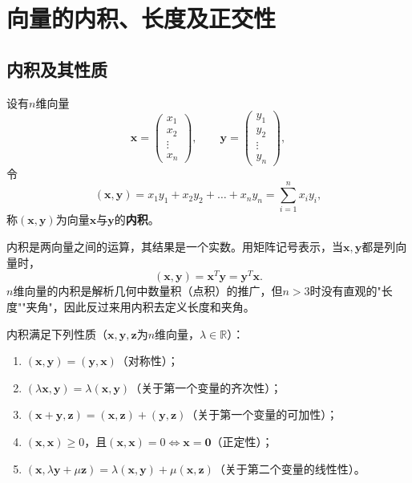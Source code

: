 
\section{向量的内积、长度及正交性}

\subsection{内积及其性质}
\begin{definition}[内积]
设有$n$维向量
\[
\boldsymbol{x}=\begin{pmatrix}x_1\\x_2\\\vdots\\x_n\end{pmatrix},
\qquad
\boldsymbol{y}=\begin{pmatrix}y_1\\y_2\\\vdots\\y_n\end{pmatrix},
\]
令
\[
(\boldsymbol{x},\boldsymbol{y})=x_1y_1+x_2y_2+\dots+x_ny_n=\sum_{i=1}^{n}x_iy_i,
\]
称$(\boldsymbol{x},\boldsymbol{y})$为向量$\boldsymbol{x}$与$\boldsymbol{y}$的\textbf{内积}。
\end{definition}

内积是两向量之间的运算，其结果是一个实数。用矩阵记号表示，当$\boldsymbol{x},\boldsymbol{y}$都是列向量时，
\[
(\boldsymbol{x},\boldsymbol{y})=\boldsymbol{x}^{T}\boldsymbol{y}=\boldsymbol{y}^{T}\boldsymbol{x}.
\]
$n$维向量的内积是解析几何中数量积（点积）的推广，但$n>3$时没有直观的"长度""夹角"，因此反过来用内积去定义长度和夹角。

内积满足下列性质（$\boldsymbol{x},\boldsymbol{y},\boldsymbol{z}$为$n$维向量，$\lambda\in\mathbb{R}$）：
\begin{enumerate}
    \item $(\boldsymbol{x},\boldsymbol{y})=(\boldsymbol{y},\boldsymbol{x})$（对称性）；
    \item $(\lambda\boldsymbol{x},\boldsymbol{y})=\lambda(\boldsymbol{x},\boldsymbol{y})$（关于第一个变量的齐次性）；
    \item $(\boldsymbol{x}+\boldsymbol{y},\boldsymbol{z})=(\boldsymbol{x},\boldsymbol{z})+(\boldsymbol{y},\boldsymbol{z})$（关于第一个变量的可加性）；
    \item $(\boldsymbol{x},\boldsymbol{x})\ge0$，且$(\boldsymbol{x},\boldsymbol{x})=0\iff\boldsymbol{x}=\boldsymbol{0}$（正定性）；
    \item $(\boldsymbol{x},\lambda\boldsymbol{y}+\mu\boldsymbol{z})=\lambda(\boldsymbol{x},\boldsymbol{y})+\mu(\boldsymbol{x},\boldsymbol{z})$（关于第二个变量的线性性）。
\end{enumerate}

